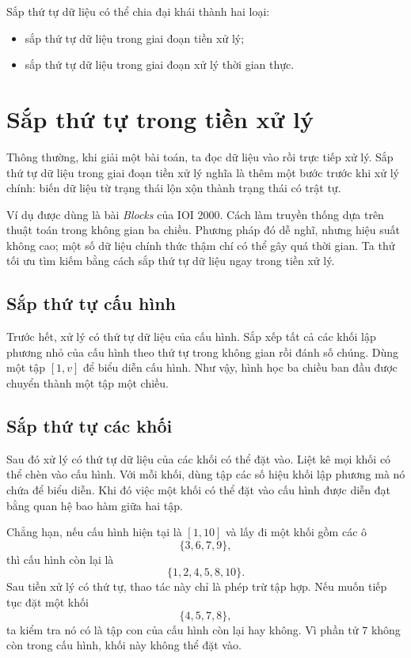 \documentclass[11pt]{article}
\begin{document}
Sắp thứ tự dữ liệu có thể chia đại khái thành hai loại:

\begin{itemize}
  \item sắp thứ tự dữ liệu trong giai đoạn tiền xử lý;
  \item sắp thứ tự dữ liệu trong giai đoạn xử lý thời gian thực.
\end{itemize}

\section{Sắp thứ tự trong tiền xử lý}

Thông thường, khi giải một bài toán, ta đọc dữ liệu vào rồi trực tiếp xử lý.
Sắp thứ tự dữ liệu trong giai đoạn tiền xử lý nghĩa là thêm một bước trước khi
xử lý chính: biến dữ liệu từ trạng thái lộn xộn thành trạng thái có trật tự.

Ví dụ được dùng là bài \textit{Blocks} của IOI 2000. Cách làm truyền thống dựa
trên thuật toán trong không gian ba chiều. Phương pháp đó dễ nghĩ, nhưng hiệu
suất không cao; một số dữ liệu chính thức thậm chí có thể gây quá thời gian.
Ta thử tối ưu tìm kiếm bằng cách sắp thứ tự dữ liệu ngay trong tiền xử lý.

\subsection{Sắp thứ tự cấu hình}

Trước hết, xử lý có thứ tự dữ liệu của cấu hình. Sắp xếp tất cả các khối lập
phương nhỏ của cấu hình theo thứ tự trong không gian rồi đánh số chúng. Dùng
một tập \([1,v]\) để biểu diễn cấu hình. Như vậy, hình học ba chiều ban đầu
được chuyển thành một tập một chiều.

\subsection{Sắp thứ tự các khối}

Sau đó xử lý có thứ tự dữ liệu của các khối có thể đặt vào. Liệt kê mọi khối
có thể chèn vào cấu hình. Với mỗi khối, dùng tập các số hiệu khối lập phương
mà nó chứa để biểu diễn. Khi đó việc một khối có thể đặt vào cấu hình được
diễn đạt bằng quan hệ bao hàm giữa hai tập.

Chẳng hạn, nếu cấu hình hiện tại là \([1,10]\) và lấy đi một khối gồm các ô
\[
  \{3,6,7,9\},
\]
thì cấu hình còn lại là
\[
  \{1,2,4,5,8,10\}.
\]
Sau tiền xử lý có thứ tự, thao tác này chỉ là phép trừ tập hợp. Nếu muốn tiếp
tục đặt một khối
\[
  \{4,5,7,8\},
\]
ta kiểm tra nó có là tập con của cấu hình còn lại hay không. Vì phần tử \(7\)
không còn trong cấu hình, khối này không thể đặt vào.
\end{document}
